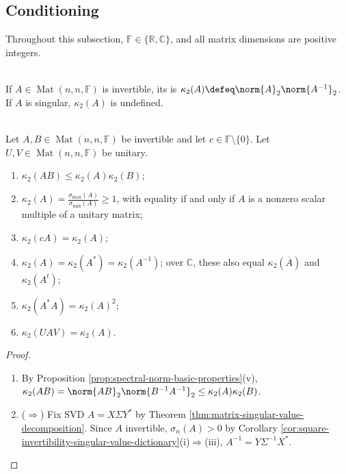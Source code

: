 \subsection{Conditioning}

Throughout this subsection, $\mathbb{F}\in\{\mathbb{R},\mathbb{C}\}$, and all matrix dimensions are positive integers.

\begin{definition} \label{def:spectral-condition-number} \\
If $A\in\operatorname{Mat}(n,n,\mathbb{F})$ is invertible, its  is $\kappa_2(A)\defeq\norm{A}_2\norm{A^{-1}}_2$. If $A$ is singular, $\kappa_2(A)$ is undefined.
\end{definition}

\begin{proposition} \label{prop:spectral-condition-number-properties} \\
Let $A,B\in\operatorname{Mat}(n,n,\mathbb{F})$ be invertible and let $c\in\mathbb{F}\setminus\{0\}$. Let $U,V\in\operatorname{Mat}(n,n,\mathbb{F})$ be unitary.
\begin{enumerate}[label=(\roman*)]
\setlength{\itemsep}{0pt}
\item $\kappa_2(AB)\leq\kappa_2(A)\kappa_2(B)$;
\item $\kappa_2(A)=\frac{\sigma_{\max}(A)}{\sigma_{\min}(A)}\geq1$, with equality if and only if $A$ is a nonzero scalar multiple of a unitary matrix;
\item $\kappa_2(cA)=\kappa_2(A)$;
\item $\kappa_2(A)=\kappa_2(A^*)=\kappa_2(A^{-1})$; over $\mathbb{C}$, these also equal $\kappa_2(\overline{A})$ and $\kappa_2(A^t)$;
\item $\kappa_2(A^*A)=\kappa_2(A)^2$;
\item $\kappa_2(UAV)=\kappa_2(A)$.
\end{enumerate}
\begin{proof}
\begin{enumerate}[label=(\roman*)]
\setlength{\itemsep}{0pt}
\item[$(i)$] By Proposition \ref{prop:spectral-norm-basic-properties}(v), $\kappa_2(AB)=\norm{AB}_2\norm{B^{-1}A^{-1}}_2\leq\kappa_2(A)\kappa_2(B)$.
\item[$(ii)$] ($\Rightarrow$) Fix SVD $A=X\Sigma Y^*$ by Theorem \ref{thm:matrix-singular-value-decomposition}. Since $A$ invertible, $\sigma_n(A)>0$ by Corollary \ref{cor:square-invertibility-singular-value-dictionary}(i)$\Rightarrow$(iii), $A^{-1}=Y\Sigma^{-1}X^*$.\\

\end{enumerate}
\end{proof}
\end{proposition}
